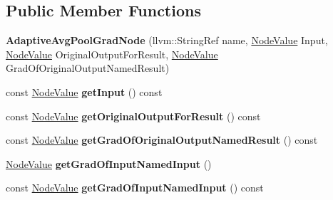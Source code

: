 \subsection*{Public Member Functions}
\begin{DoxyCompactItemize}
\item 
\mbox{\label{classglow_1_1_adaptive_avg_pool_grad_node_a76f5fe1bcc40d818b1f920bfc6c6b56e}} 
{\bfseries Adaptive\+Avg\+Pool\+Grad\+Node} (llvm\+::\+String\+Ref name, \hyperlink{structglow_1_1_node_value}{Node\+Value} Input, \hyperlink{structglow_1_1_node_value}{Node\+Value} Original\+Output\+For\+Result, \hyperlink{structglow_1_1_node_value}{Node\+Value} Grad\+Of\+Original\+Output\+Named\+Result)
\item 
\mbox{\label{classglow_1_1_adaptive_avg_pool_grad_node_aa3d5eab4db6dbbb03bcef57fceebce93}} 
const \hyperlink{structglow_1_1_node_value}{Node\+Value} {\bfseries get\+Input} () const
\item 
\mbox{\label{classglow_1_1_adaptive_avg_pool_grad_node_a9186dd8885cb3c062d881dd028685c0c}} 
const \hyperlink{structglow_1_1_node_value}{Node\+Value} {\bfseries get\+Original\+Output\+For\+Result} () const
\item 
\mbox{\label{classglow_1_1_adaptive_avg_pool_grad_node_a7f1a87b35c00a36d38cef5a5e3b9608d}} 
const \hyperlink{structglow_1_1_node_value}{Node\+Value} {\bfseries get\+Grad\+Of\+Original\+Output\+Named\+Result} () const
\item 
\mbox{\label{classglow_1_1_adaptive_avg_pool_grad_node_a6abd85e1af7641fd1a2636aff82dfec9}} 
\hyperlink{structglow_1_1_node_value}{Node\+Value} {\bfseries get\+Grad\+Of\+Input\+Named\+Input} ()
\item 
\mbox{\label{classglow_1_1_adaptive_avg_pool_grad_node_aa4a7a0b9a01bad924e6e7eb0db27dc94}} 
const \hyperlink{structglow_1_1_node_value}{Node\+Value} {\bfseries get\+Grad\+Of\+Input\+Named\+Input} () const
\item 
\mbox{\label{classglow_1_1_adaptive_avg_pool_grad_node_a18669a4e05d65a89db124a98639e7fd7}} 

\end{DoxyCompactItemize}
